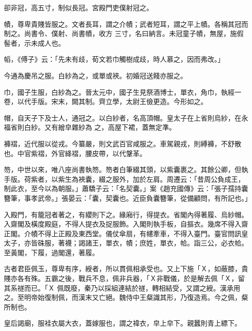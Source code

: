 \begin{pinyinscope}
 卻非冠，高五寸，制似長冠。宮殿門吏僕射冠之。



 幘，尊卑貴賤皆服之。文者長耳，謂之介幘；武者短耳，謂之平上幘。各稱其冠而制之。尚書令、僕射、尚書幘，收方
 三寸，名曰納言。未冠童子幘，無屋，施假髻者，示未成人也。



 幍，《傅子》云：「先未有歧，荀文若巾觸樹成歧，時人慕之，因而弗改。」



 今通為慶吊之服。白紗為之，或單或裌。初婚冠送餞亦服之。



 巾，國子生服，白紗為之。晉太元中，國子生見祭酒博士，單衣，角巾，執經一卷，以代手版。宋末，闕其制。齊立學，太尉王儉更造。今形如之。



 帽，自天子下及士人，通冠之。以白紗者，名高頂帽。皇太子在上省則烏紗，在永福省則白紗。又有繒皁雜紗為
 之，高屋下裙，蓋無定準。



 褲褶，近代服以從戎。今纂嚴，則文武百官咸服之。車駕親戎，則縛褲，不舒散也。中官紫褶，外官絳褶，腰皮帶，以代鞶革。



 笏，中世以來，唯八座尚書執笏。笏者白筆綴其頭，以紫囊裹之。其餘公卿，但執手版。荷紫者，以紫生為裌囊，綴之服外，加於左肩。周遷云：「昔周公負成王，制此衣，至今以為朝服。」蕭驕子云：「名契囊。」案《趙充國傳》云：「張子孺持囊簪筆，事孝武帝。」張晏云：「囊，契囊也。近臣負囊簪筆，從備顧問，有所記也。」



 入殿門，有籠冠者著之，有纓則下之。緣廂行，得提衣。省閣內得著履、烏紗帽。入齋閣及橫度殿庭，不得人提衣及捉服飾。入閣則執手板，自摳衣。幾席不得入齋正閣。介幘不得上正殿及東西堂。儀仗傘扇，有幰牽車，不得入臺門。臺官問訊皇太子，亦皆硃服，著襪；謁諸王，單衣，幘；庶姓，單衣，帢。詣三公，必衣帢。至黃閣，下履，過閣還，著履。



 古者君臣佩玉，尊卑有序，綬者，所以貫佩相承受也。又上下施「Ｘ，如蔽膝，貴賤亦各有殊。五霸之後，戰兵不息，佩非兵器，「Ｘ非戰儀，於是解去佩「Ｘ，留其系禭而已。「Ｘ
 佩既廢，秦乃以採組連結於禭，轉相結受，又謂之綬。漢承用之。至明帝始復制佩，而漢末又亡絕。魏侍中王粲識其形，乃復造焉。今之佩，粲所制也。



 皇后謁廟，服袿衣屬大衣，蓋嫁服也，謂之褘衣，皁上皁下。親蠶則青上縹下。




\end{pinyinscope}
